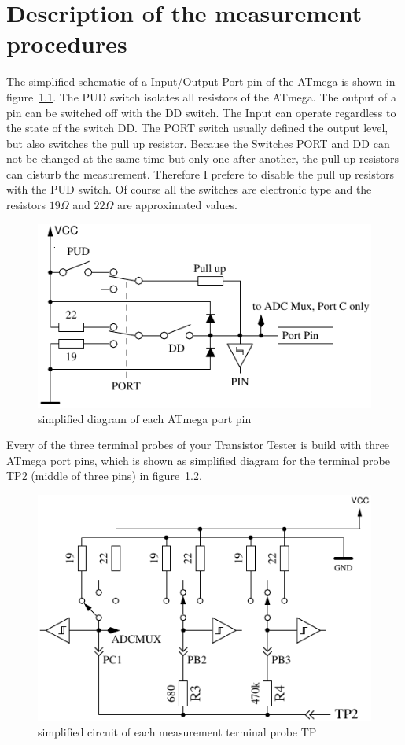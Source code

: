 \chapter{Description of the measurement procedures}
\label{sec:measurement}
The simplified schematic of a Input/Output-Port pin of the ATmega is shown in figure~\ref{fig:port}.
The PUD switch isolates all  resistors of the ATmega. The output of a pin can be switched off
with the DD switch. The Input can operate regardless to the state of the switch DD.
The PORT switch usually defined the output level, but also switches the pull up resistor.
Because the Switches PORT and DD can not be changed at the same time but only one after another, the
pull up resistors can disturb the measurement. Therefore I prefere to disable the pull up resistors with the
PUD switch.
Of course all the switches are electronic type and the resistors \(19\Omega\) and \(22\Omega\) are approximated values.

\begin{figure}[H]
\centering
\includegraphics[width=.8\textwidth]{../FIG/port.pdf}
\caption{simplified diagram of each ATmega port pin}
\label{fig:port}
\end{figure}

Every of the three terminal probes of your Transistor Tester is build with three ATmega port pins,
which is shown as simplified diagram for the terminal probe TP2 (middle of three pins) in figure~\ref{fig:terminal}.

\begin{figure}[H]
\centering
\includegraphics[width=.8\textwidth]{../FIG/terminal.pdf}
\caption{simplified circuit of each measurement terminal probe TP}
\label{fig:terminal}
\end{figure}

